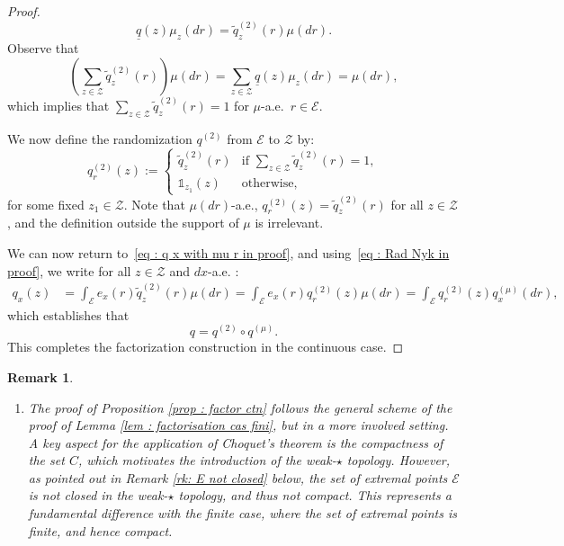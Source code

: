 \documentclass[a4paper, 11pt]{article}
\newtheorem{rem}{Remark}
\theoremstyle{definition}
\newcommand{\cE}{{\mathcal{E}}}
\newcommand{\cZ}{{\mathcal{Z}}}
\newcommand{\theconvex}{C}
\newcommand{\indi}[1]{\mathds{1}_{#1}}
\begin{document}
{\begin{proof}
\begin{equation}
\label{eq : Rad Nyk in proof}
\underline{q}(z) \mu_z(dr) = \tilde{q}^{(2)}_z(r) \mu(dr).
\end{equation}
Observe that
\begin{equation}
\label{eq: 21.5}
\left( \sum_{z \in \mathcal{Z}} \tilde{q}^{(2)}_z(r) \right) \mu(dr) = \sum_{z \in \mathcal{Z}} \underline{q}(z) \mu_z(dr) = \mu(dr),
\end{equation}
which implies that $\sum_{z \in \mathcal{Z}} \tilde{q}^{(2)}_z(r) = 1$ for $\mu$-a.e.\ $r \in \mathcal{E}$.

We now define the randomization $q^{(2)}$ from $\mathcal{E}$ to $\mathcal{Z}$ by:
\[
q^{(2)}_r(z) := 
\begin{cases}
\tilde{q}^{(2)}_z(r) & \text{if } \sum_{z \in \mathcal{Z}} \tilde{q}^{(2)}_z(r) = 1, \\
\indi{z_1}(z) & \text{otherwise},
\end{cases}
\]
for some fixed $z_1 \in \mathcal{Z}$. Note that $\mu(dr)$-a.e.,
$q^{(2)}_r(z) = \tilde{q}^{(2)}_z(r)$ for all $z \in \mathcal{Z}$, and the definition outside the support of $\mu$ is irrelevant.

We can now return to~\eqref{eq : q x with mu r in proof}, and using~\eqref{eq : Rad Nyk in proof}, we write for all $z\in\cZ$ and $dx$-a.e. :
\begin{align*}
q_x(z) &= \int_{\mathcal{E}} e_x(r) \tilde{q}^{(2)}_z(r) \mu(dr) = \int_{\mathcal{E}} e_x(r) q^{(2)}_r(z) \mu(dr) = \int_{\mathcal{E}} q^{(2)}_r(z) q^{(\mu)}_x(dr),
\end{align*}
which establishes that
\begin{equation}
\label{eq : composition in the proof ctn}
q = q^{(2)} \circ q^{(\mu)}.
\end{equation}
This completes the factorization construction in the continuous case.
\end{proof}


\begin{rem}
\begin{enumerate}
    \item The proof of Proposition \ref{prop : factor ctn} follows the general scheme of the proof of Lemma \ref{lem : factorisation cas fini}, but in a more involved setting. A key aspect for the application of Choquet's theorem is the compactness of the set $\theconvex$, which motivates the introduction of the weak-$\star$ topology. However, as pointed out in Remark \ref{rk: E not closed} below, the set of extremal points $\cE$ is not closed in the weak-$\star$ topology, and thus not compact. This represents a fundamental difference with the finite case, where the set of extremal points is finite, and hence compact.
    

\end{enumerate}
\end{rem}}
\end{document}
